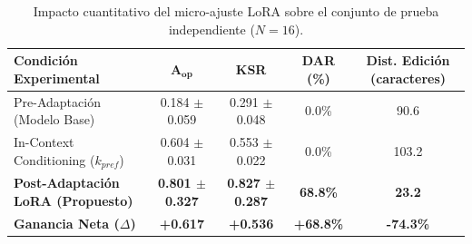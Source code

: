 \begin{table}[h]
\centering
\caption{Impacto cuantitativo del micro-ajuste LoRA sobre el conjunto de prueba independiente ($N=16$).}
\label{tab:lora_adaptation_impact}
\begin{tabular}{lcccc}
\toprule
\textbf{Condición Experimental} & $\mathbf{A_{op}}$ & \textbf{KSR} & \textbf{DAR (\%)} & \textbf{Dist. Edición (caracteres)} \\
\midrule
Pre-Adaptación (Modelo Base) & 0.184 $\pm$ 0.059 & 0.291 $\pm$ 0.048 & 0.0\% & 90.6 \\
In-Context Conditioning ($k_{pref}$) & 0.604 $\pm$ 0.031 & 0.553 $\pm$ 0.022 & 0.0\% & 103.2 \\
\textbf{Post-Adaptación LoRA (Propuesto)} & \textbf{0.801 $\pm$ 0.327} & \textbf{0.827 $\pm$ 0.287} & \textbf{68.8\%} & \textbf{23.2} \\
\midrule
\textbf{Ganancia Neta ($\Delta$)} & \textbf{+0.617} & \textbf{+0.536} & \textbf{+68.8\%} & \textbf{-74.3\%} \\
\bottomrule
\end{tabular}
\end{table}

